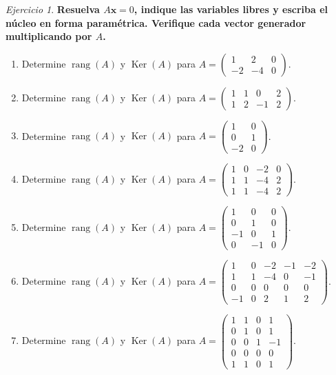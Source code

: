 \documentclass[12pt]{article}
\theoremstyle{remark}
\newtheorem{Ejer}[definicion]{Ejercicio}
\newcommand{\rang}{\operatorname{rang}}
\newcommand{\Ker}{\operatorname{Ker}}
\newcommand{\vect}[1]{\boldsymbol{#1}}
\begin{document}
\begin{Ejer}

\textbf{Resuelva $A\vect x=0$, indique las variables libres y escriba el núcleo en forma paramétrica. Verifique cada vector generador multiplicando por $A$.}
\begin{enumerate}[resume=banco]

\item Determine $\rang(A)$ y $\Ker(A)$ para $A=\begin{pmatrix}1&2&0\\-2&-4&0\end{pmatrix}$.

\item Determine $\rang(A)$ y $\Ker(A)$ para $A=\begin{pmatrix}1&1&0&2\\1&2&-1&2\end{pmatrix}$.

\item Determine $\rang(A)$ y $\Ker(A)$ para $A=\begin{pmatrix}1&0\\0&1\\-2&0\end{pmatrix}$.

\item Determine $\rang(A)$ y $\Ker(A)$ para $A=\begin{pmatrix}1&0&-2&0\\1&1&-4&2\\1&1&-4&2\end{pmatrix}$.

\item Determine $\rang(A)$ y $\Ker(A)$ para $A=\begin{pmatrix}1&0&0\\0&1&0\\-1&0&1\\0&-1&0\end{pmatrix}$.

\item Determine $\rang(A)$ y $\Ker(A)$ para $A=\begin{pmatrix}1&0&-2&-1&-2\\1&1&-4&0&-1\\0&0&0&0&0\\-1&0&2&1&2\end{pmatrix}$.

\item Determine $\rang(A)$ y $\Ker(A)$ para $A=\begin{pmatrix}1&1&0&1\\0&1&0&1\\0&0&1&-1\\0&0&0&0\\1&1&0&1\end{pmatrix}$.


\end{enumerate}
\end{Ejer}
\end{document}
